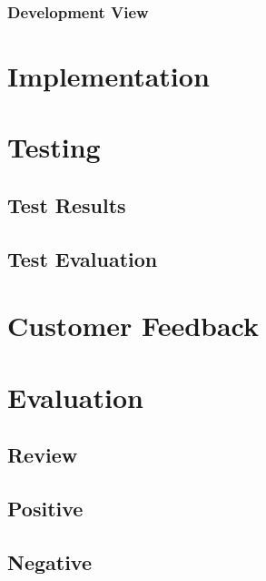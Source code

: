 \subsubsection{Development View}

\section{Implementation}

\section{Testing}
\subsection{Test Results}
\subsection{Test Evaluation}

\section{Customer Feedback}

\section{Evaluation}
\subsection{Review}
\subsection{Positive}
\subsection{Negative}
